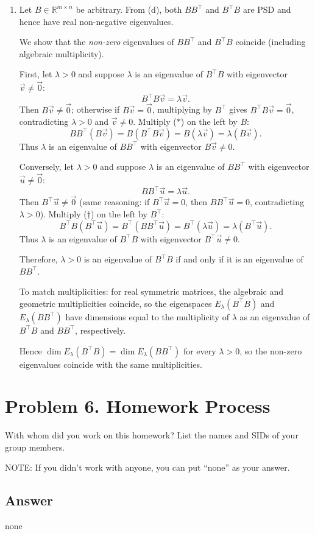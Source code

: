 \documentclass[
  12pt,
]{fphw}
\begin{document}
\begin{enumerate}
\item[(e)] Let $B\in\mathbb{R}^{m\times n}$ be arbitrary. From (d), both $BB^\top$ and $B^\top B$ are PSD and hence have real non-negative eigenvalues.

We show that the \emph{non-zero} eigenvalues of $BB^\top$ and $B^\top B$ coincide (including algebraic multiplicity).

First, let $\lambda>0$ and suppose $\lambda$ is an eigenvalue of $B^\top B$ with eigenvector $\vec{v}\neq \vec{0}$:
\[
B^\top B \vec{v} = \lambda \vec{v}. \tag{$\ast$}
\]
Then $B\vec{v}\neq \vec{0}$; otherwise if $B\vec{v}=\vec{0}$, multiplying by $B^\top$ gives $B^\top B\vec{v}=\vec{0}$, contradicting $\lambda>0$ and $\vec{v}\neq 0$.
Multiply ($\ast$) on the left by $B$:
\[
BB^\top (B\vec{v}) = B(B^\top B\vec{v}) = B(\lambda \vec{v}) = \lambda (B\vec{v}).
\]
Thus $\lambda$ is an eigenvalue of $BB^\top$ with eigenvector $B\vec{v}\neq 0$.

Conversely, let $\lambda>0$ and suppose $\lambda$ is an eigenvalue of $BB^\top$ with eigenvector $\vec{u}\neq \vec{0}$:
\[
BB^\top \vec{u} = \lambda \vec{u}. \tag{$\dagger$}
\]
Then $B^\top \vec{u}\neq \vec{0}$ (same reasoning: if $B^\top \vec{u}=0$, then $BB^\top \vec{u}=0$, contradicting $\lambda>0$).
Multiply ($\dagger$) on the left by $B^\top$:
\[
B^\top B (B^\top \vec{u}) = B^\top (BB^\top \vec{u}) = B^\top (\lambda \vec{u}) = \lambda (B^\top \vec{u}).
\]
Thus $\lambda$ is an eigenvalue of $B^\top B$ with eigenvector $B^\top \vec{u}\neq 0$.

Therefore, $\lambda>0$ is an eigenvalue of $B^\top B$ if and only if it is an eigenvalue of $BB^\top$.

To match multiplicities: 
for real symmetric matrices, the algebraic and geometric multiplicities coincide, so the eigenspaces $E_\lambda(B^\top B)$ and $E_\lambda(BB^\top)$ have dimensions equal to the multiplicity of $\lambda$ as an eigenvalue of $B^\top B$ and $BB^\top$, respectively. 

Hence $\dim E_\lambda(B^\top B)=\dim E_\lambda(BB^\top)$ for every $\lambda>0$, so the non-zero eigenvalues coincide with the same multiplicities.
\end{enumerate}

\newpage
\section*{Problem 6. Homework Process}

With whom did you work on this homework? List the names and SIDs of your group members.

NOTE: If you didn’t work with anyone, you can put “none” as your answer.

\subsection*{Answer}
none

\end{document}
